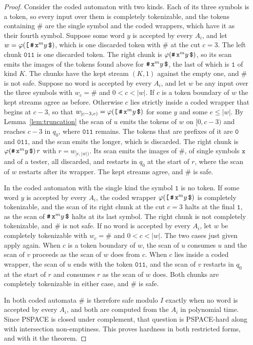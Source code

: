 \documentclass[11pt,a4paper]{article}
\theoremstyle{definition}
\theoremstyle{plain}
\newcommand{\code}[1]{\texttt{#1}}
\begin{document}
\begin{proof}
Consider the coded automaton with two kinds. Each of its three symbols is a token, so every input over them is
completely tokenizable, and the tokens containing $\code{\#}$ are the single symbol and the coded wrappers, which have
it as their fourth symbol. Suppose some word $y$ is accepted by every $A_i$, and let
$w = \varphi(\code{[}\,\code{\#}\,\code{x}^m y\,\code{\symbol{36}})$, which is one discarded token with $\code{\#}$ at
the cut $c = 3$. The left chunk $\code{011}$ is one discarded token. The right chunk is
$\varphi(\code{\#}\,\code{x}^m y\,\code{\symbol{36}})$, so its scan emits the images of the tokens found above for
$\code{\#}\,\code{x}^m y\,\code{\symbol{36}}$, the last of which is $\code{1}$ of kind $K$. The chunks have the kept
stream $(K, 1)$ against the empty one, and $\code{\#}$ is not safe. Suppose no word is accepted by every $A_i$, and let
$w$ be any input over the three symbols with $w_c = \code{\#}$ and $0 < c < |w|$. If $c$ is a token boundary of $w$ the
kept streams agree as before. Otherwise $c$ lies strictly inside a coded wrapper that begins at $c - 3$, so that
$w_{[c-3,e)} = \varphi(\code{[}\,\code{\#}\,\code{x}^m y\,\code{\symbol{36}})$ for some $y$ and some $e \leq |w|$. By
Lemma~\ref{lem:truncation} the scan of $u$ emits the tokens of $w$ on $[0, c - 3)$ and reaches $c - 3$ in $q_0$, where
$\code{011}$ remains. The tokens that are prefixes of it are $\code{0}$ and $\code{011}$, and the scan emits the longer,
which is discarded. The right chunk is $\varphi(\code{\#}\,\code{x}^m y\,\code{\symbol{36}})\,r$ with $r = w_{[e,|w|)}$.
Its scan emits the images of $\code{\#}$, of single symbols $\code{x}$ and of a tester, all discarded, and restarts in
$q_0$ at the start of $r$, where the scan of $w$ restarts after its wrapper. The kept streams agree, and $\code{\#}$ is
safe.

In the coded automaton with the single kind the symbol $\code{1}$ is no token. If some word $y$ is accepted by every
$A_i$, the coded wrapper $\varphi(\code{[}\,\code{\#}\,\code{x}^m y\,\code{\symbol{36}})$ is completely tokenizable, and
the scan of its right chunk at the cut $c = 3$ halts at the final $\code{1}$, as the scan of
$\code{\#}\,\code{x}^m y\,\code{\symbol{36}}$ halts at its last symbol. The right chunk is not completely tokenizable,
and $\code{\#}$ is not safe. If no word is accepted by every $A_i$, let $w$ be completely tokenizable with
$w_c = \code{\#}$ and $0 < c < |w|$. The two cases just given apply again. When $c$ is a token boundary of $w$, the scan
of $u$ consumes $u$ and the scan of $v$ proceeds as the scan of $w$ does from $c$. When $c$ lies inside a coded wrapper,
the scan of $u$ ends with the token $\code{011}$, and the scan of $v$ restarts in $q_0$ at the start of $r$ and consumes
$r$ as the scan of $w$ does. Both chunks are completely tokenizable in either case, and $\code{\#}$ is safe.

In both coded automata $\code{\#}$ is therefore safe modulo $I$ exactly when no word is accepted by every $A_i$, and
both are computed from the $A_i$ in polynomial time. Since PSPACE is closed under complement, that question is
PSPACE-hard along with intersection non-emptiness. This proves hardness in both restricted forms, and with it the
theorem.
\end{proof}
\end{document}
